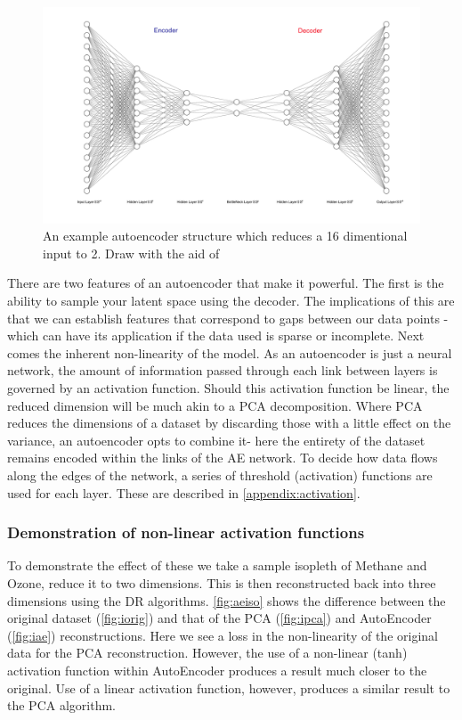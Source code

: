 \begin{figure}[H]
\includegraphics[width=\textwidth]{4fig/ae.pdf}
\caption{An example autoencoder structure which reduces a 16 dimentional input to 2. Draw with the aid of \citep{drawae}}
\end{figure}



There are two features of an autoencoder that make it powerful. The first is the ability to sample your latent space using the decoder. The implications of this are that we can establish features that correspond to gaps between our data points - which can have its application if the data used is sparse or incomplete. Next comes the inherent non-linearity of the model. As an autoencoder is just a neural network, the amount of information passed through each link between layers is governed by an activation function. Should this activation function be linear, the reduced dimension will be much akin to a PCA decomposition. Where PCA reduces the dimensions of a dataset by discarding those with a little effect on the variance, an autoencoder opts to combine it- here the entirety of the dataset remains encoded within the links of the AE network. To decide how data flows along the edges of the network, a series of threshold (activation) functions are used for each layer. These are described in \autoref{appendix:activation}.



\subsubsection{Demonstration of non-linear activation functions}

To demonstrate the effect of these we take a sample isopleth of Methane and Ozone, reduce it to two dimensions. This is then reconstructed back into three dimensions using the DR algorithms. 
\autoref{fig:aeiso} shows the difference between the original dataset (\autoref{fig:iorig}) and that of the PCA (\autoref{fig:ipca}) and AutoEncoder (\autoref{fig:iae}) reconstructions. Here we see a loss in the non-linearity of the original data for the PCA reconstruction. However, the use of a non-linear (tanh) activation function within AutoEncoder produces a result much closer to the original. Use of a linear activation function, however, produces a similar result to the PCA algorithm. 

